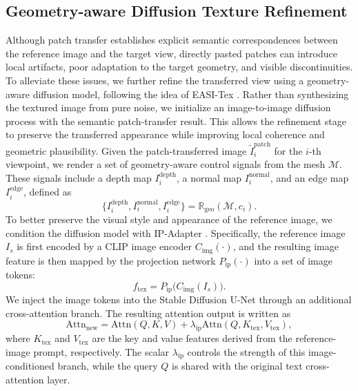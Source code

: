 \documentclass{article}
\begin{document}
\subsection{Geometry-aware Diffusion Texture Refinement}
Although patch transfer establishes explicit semantic correspondences between the reference image and the target view, directly pasted patches can introduce local artifacts, poor adaptation to the target geometry, and visible discontinuities. To alleviate these issues, we further refine the transferred view using a geometry-aware diffusion model, following the idea of EASI-Tex \cite{perla2024easi}. Rather than synthesizing the textured image from pure noise, we initialize an image-to-image diffusion process with the semantic patch-transfer result. This allows the refinement stage to preserve the transferred appearance while improving local coherence and geometric plausibility.
Given the patch-transferred image $\tilde{I}^{\mathrm{patch}}_i$ for the $i$-th viewpoint, we render a set of geometry-aware control signals from the mesh $\mathcal{M}$. These signals include a depth map $I_i^{\mathrm{depth}}$, a normal map $I_i^{\mathrm{normal}}$, and an edge map $I_i^{\mathrm{edge}}$, defined as
\begin{equation}
\{I_i^{\mathrm{depth}}, I_i^{\mathrm{normal}}, I_i^{\mathrm{edge}}\}
= \mathbb{R}_{\mathrm{geo}}(\mathcal{M}, c_i).
\end{equation}
To better preserve the visual style and appearance of the reference image, we condition the diffusion model with IP-Adapter \cite{ye2023ipadapter}. Specifically, the reference image $I_s$ is first encoded by a CLIP\cite{radford2021learning} image encoder $C_{\mathrm{img}}(\cdot)$, and the resulting image feature is then mapped by the projection network $P_{\mathrm{ip}}(\cdot)$ into a set of image tokens:
\begin{equation}
f_{\mathrm{tex}} = P_{\mathrm{ip}}\bigl(C_{\mathrm{img}}(I_s)\bigr).
\end{equation}
We inject the image tokens into the Stable Diffusion U-Net through an additional cross-attention branch. The resulting attention output is written as
\begin{equation}
\mathrm{Attn}_{\mathrm{new}}
=
\mathrm{Attn}(Q, K, V)
+
\lambda_{\mathrm{ip}}
\mathrm{Attn}(Q, K_{\mathrm{tex}}, V_{\mathrm{tex}}),
\end{equation}
where $K_{\mathrm{tex}}$ and $V_{\mathrm{tex}}$ are the key and value features derived from the reference-image prompt, respectively. The scalar $\lambda_{\mathrm{ip}}$ controls the strength of this image-conditioned branch, while the query $Q$ is shared with the original text cross-attention layer.
\end{document}
